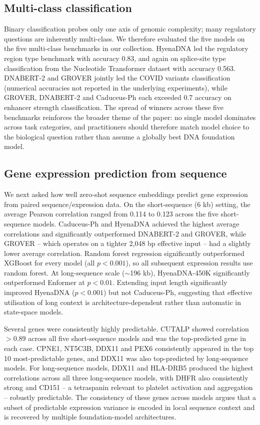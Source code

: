 \documentclass[11pt,a4paper]{article}
\begin{document}
\subsection{Multi-class classification}
Binary classification probes only one axis of genomic complexity; many regulatory questions are inherently multi-class. We therefore evaluated the five models on the five multi-class benchmarks in our collection. HyenaDNA led the regulatory region type benchmark with accuracy 0.83, and again on splice-site type classification from the Nucleotide Transformer dataset with accuracy 0.563. DNABERT-2 and GROVER jointly led the COVID variants classification (numerical accuracies not reported in the underlying experiments), while GROVER, DNABERT-2 and Caduceus-Ph each exceeded 0.7 accuracy on enhancer strength classification. The spread of winners across these five benchmarks reinforces the broader theme of the paper: no single model dominates across task categories, and practitioners should therefore match model choice to the biological question rather than assume a globally best DNA foundation model.

\subsection{Gene expression prediction from sequence}
We next asked how well zero-shot sequence embeddings predict gene expression from paired sequence/expression data. On the short-sequence (6 kb) setting, the average Pearson correlation ranged from 0.114 to 0.123 across the five short-sequence models. Caduceus-Ph and HyenaDNA achieved the highest average correlations and significantly outperformed DNABERT-2 and GROVER, while GROVER -- which operates on a tighter 2{,}048 bp effective input -- had a slightly lower average correlation. Random forest regression significantly outperformed XGBoost for every model (all $p < 0.001$), so all subsequent expression results use random forest. At long-sequence scale ($\sim$196 kb), HyenaDNA-450K significantly outperformed Enformer at $p < 0.01$. Extending input length significantly improved HyenaDNA ($p < 0.001$) but not Caduceus-Ph, suggesting that effective utilisation of long context is architecture-dependent rather than automatic in state-space models.

Several genes were consistently highly predictable. CUTALP showed correlation $> 0.89$ across all five short-sequence models and was the top-predicted gene in each case. CPNE1, NT5C3B, DDX11 and PEX6 consistently appeared in the top 10 most-predictable genes, and DDX11 was also top-predicted by long-sequence models. For long-sequence models, DDX11 and HLA-DRB5 produced the highest correlations across all three long-sequence models, with DHFR also consistently strong and CD151 -- a tetraspanin relevant to platelet activation and aggregation -- robustly predictable. The consistency of these genes across models argues that a subset of predictable expression variance is encoded in local sequence context and is recovered by multiple foundation-model architectures.
\end{document}
